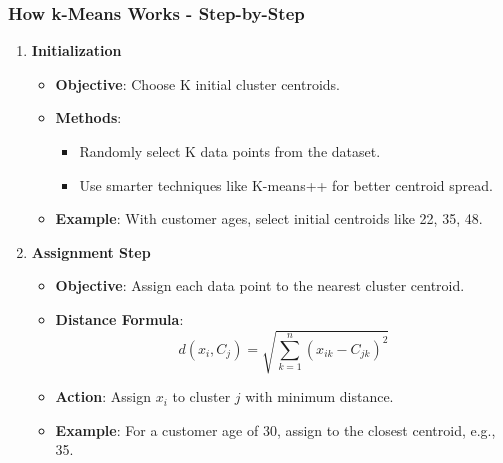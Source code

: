 \documentclass[aspectratio=169]{beamer}
\begin{document}
\begin{frame}[fragile]
    \frametitle{How k-Means Works - Step-by-Step}
    \begin{enumerate}
        \item \textbf{Initialization}
        \begin{itemize}
            \item \textbf{Objective}: Choose K initial cluster centroids.
            \item \textbf{Methods}:
            \begin{itemize}
                \item Randomly select K data points from the dataset.
                \item Use smarter techniques like K-means++ for better centroid spread.
            \end{itemize}
            \item \textbf{Example}: With customer ages, select initial centroids like 22, 35, 48.
        \end{itemize}

        \item \textbf{Assignment Step}
        \begin{itemize}
            \item \textbf{Objective}: Assign each data point to the nearest cluster centroid.
            \item \textbf{Distance Formula}:
            \begin{equation}
                d(x_i, C_j) = \sqrt{\sum_{k=1}^{n}(x_{ik} - C_{jk})^2}
            \end{equation}
            \item \textbf{Action}: Assign \(x_i\) to cluster \(j\) with minimum distance.
            \item \textbf{Example}: For a customer age of 30, assign to the closest centroid, e.g., 35.
        \end{itemize}
    \end{enumerate}
\end{frame}
\end{document}
